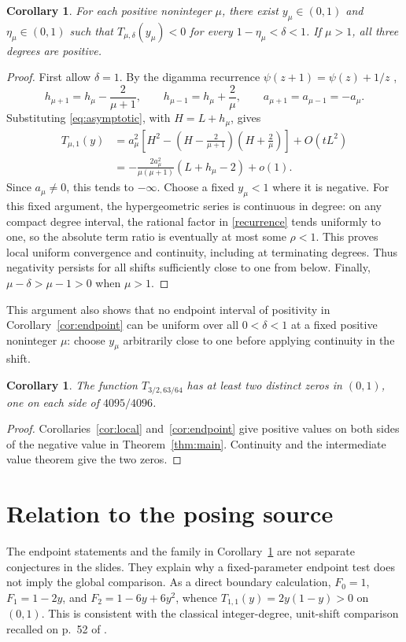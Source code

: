 \documentclass[11pt]{article}
\newtheorem{corollary}[theorem]{Corollary}
\newcommand{\F}{F}
\begin{document}
\begin{corollary}\label{cor:family}
For each positive noninteger $\mu$, there exist $y_\mu\in(0,1)$
and $\eta_\mu\in(0,1)$ such that
$T_{\mu,\delta}(y_\mu)<0$ for every $1-\eta_\mu<\delta<1$.
If $\mu>1$, all three degrees are positive.
\end{corollary}
\begin{proof}
First allow $\delta=1$. By the digamma recurrence
$\psi(z+1)=\psi(z)+1/z$ \cite[Eq.~5.5.2]{dlmfgamma},
\[
 h_{\mu+1}=h_\mu-\frac{2}{\mu+1},\qquad
 h_{\mu-1}=h_\mu+\frac{2}{\mu},\qquad
 a_{\mu+1}=a_{\mu-1}=-a_\mu.
\]
Substituting \eqref{eq:asymptotic}, with $H=L+h_\mu$, gives
\begin{align*}
 T_{\mu,1}(y)
 &=a_\mu^2\left[H^2-
       \left(H-\frac{2}{\mu+1}\right)
       \left(H+\frac{2}{\mu}\right)\right]+O(tL^2)\\
 &=-\frac{2a_\mu^2}{\mu(\mu+1)}(L+h_\mu-2)+o(1).
\end{align*}
Since $a_\mu\ne0$, this tends to $-\infty$.
Choose a fixed $y_\mu<1$ where it is negative.
For this fixed argument, the hypergeometric series is continuous in
degree: on any compact degree interval, the rational factor in
\eqref{recurrence} tends uniformly to one, so the absolute term ratio
is eventually at most some $\rho<1$. This proves local uniform
convergence and continuity, including at terminating degrees.
Thus negativity persists for all shifts sufficiently close to one from
below. Finally, $\mu-\delta>\mu-1>0$ when $\mu>1$.
\end{proof}
This argument also shows that no endpoint interval of positivity in
Corollary~\ref{cor:endpoint} can be uniform over all $0<\delta<1$
at a fixed positive noninteger $\mu$: choose $y_\mu$ arbitrarily close
to one before applying continuity in the shift.

\begin{corollary}\label{cor:zeros}
The function $T_{3/2,63/64}$ has at least two distinct zeros in $(0,1)$,
one on each side of $4095/4096$.
\end{corollary}
\begin{proof}
Corollaries~\ref{cor:local} and~\ref{cor:endpoint} give positive values
on both sides of the negative value in Theorem~\ref{thm:main}.
Continuity and the intermediate value theorem give the two zeros.
\end{proof}

\section{Relation to the posing source}
The endpoint statements and the family in
Corollary~\ref{cor:family} are not separate conjectures in the slides.
They explain why a fixed-parameter endpoint test does not imply the
global comparison. As a direct boundary calculation,
$\F_0=1$, $\F_1=1-2y$, and $\F_2=1-6y+6y^2$, whence
$T_{1,1}(y)=2y(1-y)>0$ on $(0,1)$.
This is consistent with the classical integer-degree, unit-shift
comparison recalled on p.~52 of \cite{karp}.
\end{document}

